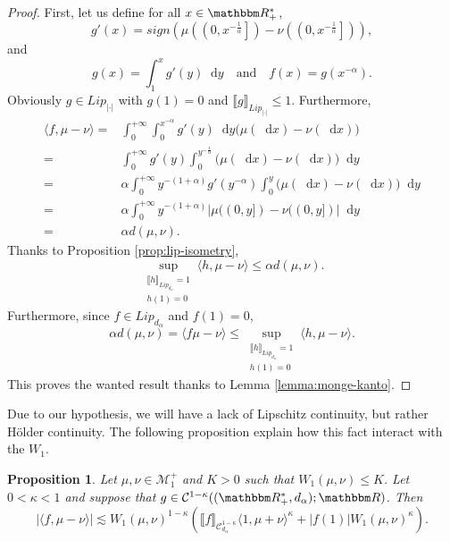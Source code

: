 \documentclass[a4paper,11pt, reqno]{amsart}
\newcommand{\cC}{\mathcal{C}}	\newcommand{\CC}{\mathbbm{C}}
\newcommand{\cM}{\mathcal{M}}	\newcommand{\MM}{\mathbbm{M}}
\newcommand{\dd}{\mathop{}\!\mathrm{d}}
\newcommand{\1}{\mathbbm{1}}
\theoremstyle{plain}
\newtheorem{proposition}[theorem]{Proposition}
\theoremstyle{definition}
\begin{document}
\begin{proof}
First, let us define for all $x\in\RR_+^*$,
\[g'(x) = sign\left(\mu\left(\left(0,x^{-\frac{1}{\alpha}}\right]\right) - \nu\left(\left(0,x^{-\frac{1}{\alpha}}\right]\right)\right),\]
and
\[g(x) = \int_1^x g'(y) \dd y \quad \text{and} \quad f(x) = g(x^{-\alpha}).\]
Obviously $g \in Lip_{|\cdot|}$ with $g(1) = 0$ and $\llbracket g \rrbracket_{Lip_{|\cdot|}}   \le 1$.
Furthermore, 
\begin{align*}
    \langle f , \mu-\nu\rangle = & \int_0^{+\infty} \int_0^{x^{-\alpha}} g'(y) \dd y \big(\mu(\dd x)- \nu(\dd x) \big) \\
    = & \int_0^{+\infty} g'(y) \int_0^{y^{-\frac{1}{\alpha}}}  \big(\mu(\dd x)-\nu(\dd x) \big) \dd y \\
    = & \alpha\int_0^{+\infty} y^{-(1+\alpha)} g'(y^{-\alpha}) \int_0^{y} \big(\mu(\dd x)-\nu(\dd x) \big) \dd y \\
    = & \alpha\int_0^{+\infty} y^{-(1+\alpha)} \big|\mu((0,y])-\nu((0,y]) \big| \dd y \\
    = & \alpha d(\mu,\nu).
\end{align*}
Thanks to Proposition \ref{prop:lip-isometry}, 
\[\sup_{\substack{\llbracket h\rrbracket_{Lip_{d_\alpha}} = 1 \\  h(1) = 0 }} \langle h, \mu - \nu \rangle \le \alpha d(\mu,\nu).\]
Furthermore, since $f\in Lip_{d_\alpha}$ and $f(1) = 0$, 
\[\alpha d(\mu,\nu) = \langle f \mu - \nu \rangle \le \sup_{\substack{\llbracket h\rrbracket_{Lip_{d_\alpha}} = 1 \\  h(1) = 0 }} \langle h, \mu - \nu \rangle.\]
This proves the wanted result thanks to Lemma \ref{lemma:monge-kanto}.
\end{proof}

Due to our hypothesis, we will have a lack of Lipschitz continuity, but rather Hölder continuity. The following proposition explain how this fact interact with the $W_1$.

\begin{proposition}
    Let $\mu,\nu \in \cM_1^+$ and $K>0$ such that $W_1(\mu,\nu) \le K$. Let $0<\kappa<1$ and suppose that $g\in \cC^{1-\kappa}((\RR_+^*,d_\alpha);\RR)$. Then
    \[|\langle f,\mu-\nu\rangle| \lesssim  W_1(\mu,\nu)^{1-\kappa}\left(\llbracket f\rrbracket_{\cC^{1-\kappa}_{d_\alpha}}\langle 1 , \mu + \nu \rangle^{\kappa}+|f(1)|W_1(\mu,\nu)^\kappa\right).\]
\end{proposition}
\end{document}
